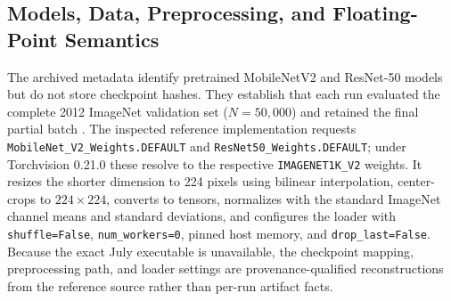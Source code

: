 \documentclass[electronics,article,submit,pdftex,moreauthors]{Definitions/mdpi}
\newcommand{\mobile}{MobileNetV2}
\newcommand{\resnet}{ResNet-50}
\begin{document}
\begin{table}[t]
\caption{Archived campaigns and their inferential role. Each run evaluates all 50,000 validation images.}
\label{tab:campaigns}
\centering
\small
{}
\end{table}

\subsection{Models, Data, Preprocessing, and Floating-Point Semantics}

The archived metadata identify pretrained \mobile{} and \resnet{} models but do not store checkpoint hashes. They establish that each run evaluated the complete 2012 ImageNet validation set ($N=50{,}000$) and retained the final partial batch \cite{deng2009imagenet,russakovsky2015ilsvrc}. The inspected reference implementation requests \texttt{MobileNet\_V2\_Weights.DEFAULT} and \texttt{ResNet50\_Weights.DEFAULT}; under Torchvision 0.21.0 these resolve to the respective \texttt{IMAGENET1K\_V2} weights. It resizes the shorter dimension to 224 pixels using bilinear interpolation, center-crops to $224\times224$, converts to tensors, normalizes with the standard ImageNet channel means and standard deviations, and configures the loader with \texttt{shuffle=False}, \texttt{num\_workers=0}, pinned host memory, and \texttt{drop\_last=False}. Because the exact July executable is unavailable, the checkpoint mapping, preprocessing path, and loader settings are provenance-qualified reconstructions from the reference source rather than per-run artifact facts.
\end{document}
